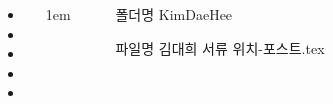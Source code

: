 \documentclass[20pt, a1paper ]{tikzposter}
\begin{document}
\begin{columns}
{\begin{large}
\begin{itemize}
			\end{itemize}
			\end{large}
		}


			{				
			\setlength{\leftmargini}{3em}			
			\setlength{\labelsep}{1em} %

			\begin{large}
			\begin{itemize}
			\item 
			\item 
			\item 
			\item 
			\item 

			\end{itemize}
			\end{large}
		}

			{
					\setlength{\leftmargini}{8em}
					\setlength{\labelsep} {1em}
				\begin{large}
					\begin{itemize}
					\item [폴더명] KimDaeHee
					\item [파일명] 김대희 서류 위치-포스트.tex 
					\end{itemize}
				\end{large}
			}


	\end{columns}
\end{document}
